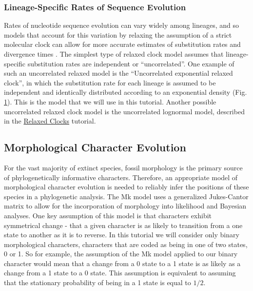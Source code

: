 \subsubsection{Lineage-Specific Rates of Sequence Evolution}\label{subsub:Intro-GTR-UExp}

Rates of nucleotide sequence evolution can vary widely among lineages, and so models that account for this variation by relaxing the assumption of a strict molecular clock can allow for more accurate estimates of substitution rates and divergence times \citep{Drummond2006}.
The simplest type of relaxed clock model assumes that lineage-specific substitution rates are independent or ``uncorrelated''.
One example of such an uncorrelated relaxed model is the ``Uncorrelated exponential relaxed clock'', in which the substitution rate for each lineage is assumed to be independent and identically distributed according to an exponential density (Fig. \ref{fig:uexp_gm}).
This is the model that we will use in this tutorial.
Another possible uncorrelated relaxed clock model is the uncorrelated lognormal model, described in the \href{https://github.com/revbayes/revbayes_tutorial/raw/master/tutorial_TeX/RB_Dating_Tutorial/RB_Dating_Tutorial.pdf}{Relaxed Clocks} tutorial.
\begin{figure}[h!]
\label{fig:uexp_gm}
\end{figure}


\subsection{Morphological Character Evolution}\label{subsect:Intro-Morpho}

For the vast majority of extinct species, fossil morphology is the primary source of phylogenetically informative characters.
Therefore, an appropriate model of morphological character evolution is needed to reliably infer the positions of these species in a phylogenetic analysis.
The Mk model \citep{Lewis2001} uses a generalized Jukes-Cantor matrix to allow for the incorporation of morphology into likelihood and Bayesian analyses.
One key assumption of this model is that characters exhibit symmetrical change - that a given character is as likely to transition from a one state to another as it is to reverse.
In this tutorial we will consider only binary morphological characters, \IE characters that are coded as being in one of two states, 0 or 1.
So for example, the assumption of the Mk model applied to our binary character would mean that a change from a 0 state to a 1 state is as likely as a change from a 1 state to a 0 state.
This assumption is equivalent to assuming that the stationary probability of being in a 1 state is equal to $1/2$.

